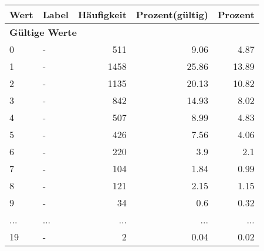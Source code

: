      \begin{longtable}{lXrrr}
     \toprule
     \textbf{Wert} & \textbf{Label} & \textbf{Häufigkeit} & \textbf{Prozent(gültig)} & \textbf{Prozent} \\
     \endhead
     \midrule
     \multicolumn{5}{l}{\textbf{Gültige Werte}}\\
        0 & \multicolumn{1}{X}{-} & %
          \num{511} &
          \num[round-mode=places,round-precision=2]{9.06} &
          \num[round-mode=places,round-precision=2]{4.87} \\
        1 & \multicolumn{1}{X}{-} & %
          \num{1458} &
          \num[round-mode=places,round-precision=2]{25.86} &
          \num[round-mode=places,round-precision=2]{13.89} \\
        2 & \multicolumn{1}{X}{-} & %
          \num{1135} &
          \num[round-mode=places,round-precision=2]{20.13} &
          \num[round-mode=places,round-precision=2]{10.82} \\
        3 & \multicolumn{1}{X}{-} & %
          \num{842} &
          \num[round-mode=places,round-precision=2]{14.93} &
          \num[round-mode=places,round-precision=2]{8.02} \\
        4 & \multicolumn{1}{X}{-} & %
          \num{507} &
          \num[round-mode=places,round-precision=2]{8.99} &
          \num[round-mode=places,round-precision=2]{4.83} \\
        5 & \multicolumn{1}{X}{-} & %
          \num{426} &
          \num[round-mode=places,round-precision=2]{7.56} &
          \num[round-mode=places,round-precision=2]{4.06} \\
        6 & \multicolumn{1}{X}{-} & %
          \num{220} &
          \num[round-mode=places,round-precision=2]{3.9} &
          \num[round-mode=places,round-precision=2]{2.1} \\
        7 & \multicolumn{1}{X}{-} & %
          \num{104} &
          \num[round-mode=places,round-precision=2]{1.84} &
          \num[round-mode=places,round-precision=2]{0.99} \\
        8 & \multicolumn{1}{X}{-} & %
          \num{121} &
          \num[round-mode=places,round-precision=2]{2.15} &
          \num[round-mode=places,round-precision=2]{1.15} \\
        9 & \multicolumn{1}{X}{-} & %
          \num{34} &
          \num[round-mode=places,round-precision=2]{0.6} &
          \num[round-mode=places,round-precision=2]{0.32} \\
       ... & ... & ... & ... & ... \\
        19 & \multicolumn{1}{X}{-} & %
          \num{2} &
          \num[round-mode=places,round-precision=2]{0.04} &
          \num[round-mode=places,round-precision=2]{0.02} \\


\end{longtable}
